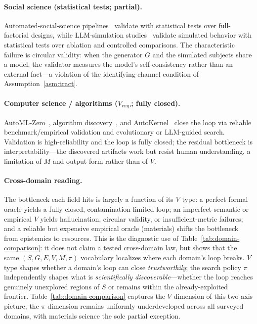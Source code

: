 \documentclass{article}
\begin{document}
\paragraph{Social science (statistical tests; partial).} Automated-social-science pipelines~\citep{manning2024automated} validate with statistical tests over full-factorial designs, while LLM-simulation studies~\citep{aher2023turing,park2023generative} validate simulated behavior with statistical tests over ablation and controlled comparisons. The characteristic failure is circular validity: when the generator $G$ and the simulated subjects share a model, the validator measures the model's self-consistency rather than an external fact---a violation of the identifying-channel condition of Assumption~\ref{asm:tract}.

\paragraph{Computer science / algorithms ($V_\text{emp}$; fully closed).} AutoML-Zero~\citep{real2020automlzero}, algorithm discovery~\citep{surina2025algodiscovery}, and AutoKernel~\citep{jaber2026autokernel} close the loop via reliable benchmark/empirical validation and evolutionary or LLM-guided search. Validation is high-reliability and the loop is fully closed; the residual bottleneck is interpretability---the discovered artifacts work but resist human understanding, a limitation of $M$ and output form rather than of $V$.

\paragraph{Cross-domain reading.} The bottleneck each field hits is largely a function of its $V$ type: a perfect formal oracle yields a fully closed, contamination-limited loop; an imperfect semantic or empirical $V$ yields hallucination, circular validity, or insufficient-metric failures; and a reliable but expensive empirical oracle (materials) shifts the bottleneck from epistemics to resources. This is the diagnostic use of Table~\ref{tab:domain-comparison}: it does not claim a tested cross-domain law, but shows that the same $(S,G,E,V,M,\pi)$ vocabulary localizes where each domain's loop breaks. $V$ type shapes whether a domain's loop can close \emph{trustworthily}; the search policy $\pi$ independently shapes what is \emph{scientifically discoverable}---whether the loop reaches genuinely unexplored regions of $S$ or remains within the already-exploited frontier. Table~\ref{tab:domain-comparison} captures the $V$ dimension of this two-axis picture; the $\pi$ dimension remains uniformly underdeveloped across all surveyed domains, with materials science the sole partial exception.
\end{document}
